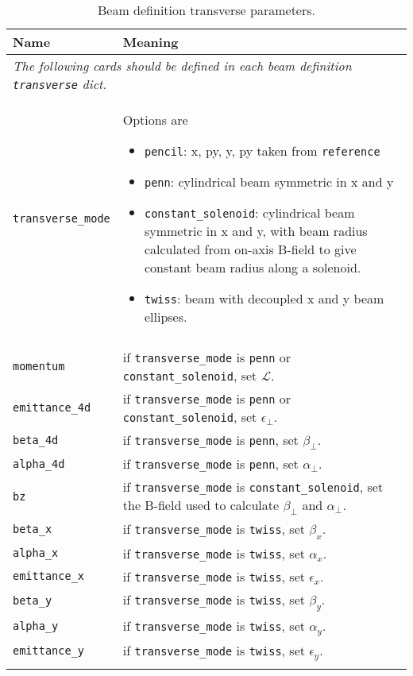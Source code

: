 \begin{table*}
\begin{center}
\caption{Beam definition transverse parameters.}
\begin{tabularx}{\linewidth}{lX}
Name & Meaning \\
\hline
\multicolumn{2}{|l|}{\emph{The following cards should be defined in each beam definition \verb|transverse| dict.}} \\
\hline
\verb|transverse_mode| & Options are
                          \begin{itemize}
                            \setlength{\itemsep}{0mm}
                            \item \verb|pencil|: x, py, y, py taken from \verb|reference|
                            \item \verb|penn|: cylindrical beam symmetric in x and y
                            \item \verb|constant_solenoid|: cylindrical beam symmetric in x and y, with beam radius calculated from on-axis B-field to give constant beam radius along a solenoid.
                            \item \verb|twiss|: beam with decoupled x and y beam ellipses.
                          \end{itemize} \\
\hline
\begin{tabular}{l}\verb|normalised_angular_| \\ \verb|momentum| \end{tabular} & if \verb|transverse_mode| is \verb|penn| or \verb|constant_solenoid|, set $\mathcal{L}$.\\
\verb|emittance_4d| & if \verb|transverse_mode| is \verb|penn| or \verb|constant_solenoid|, set $\epsilon_\perp$.\\
\verb|beta_4d| & if \verb|transverse_mode| is \verb|penn|, set $\beta_\perp$.\\
\verb|alpha_4d| & if \verb|transverse_mode| is \verb|penn|, set $\alpha_\perp$.\\
\verb|bz| & if \verb|transverse_mode| is \verb|constant_solenoid|, set the B-field used to calculate $\beta_\perp$ and $\alpha_\perp$.\\
\hline
\verb|beta_x| & if \verb|transverse_mode| is \verb|twiss|, set $\beta_x$.\\
\verb|alpha_x| & if \verb|transverse_mode| is \verb|twiss|, set $\alpha_x$.\\
\verb|emittance_x| & if \verb|transverse_mode| is \verb|twiss|, set $\epsilon_x$.\\
\verb|beta_y| & if \verb|transverse_mode| is \verb|twiss|, set $\beta_y$.\\
\verb|alpha_y| & if \verb|transverse_mode| is \verb|twiss|, set $\alpha_y$.\\
\verb|emittance_y| & if \verb|transverse_mode| is \verb|twiss|, set $\epsilon_y$.\\
\begin{makeimage} %
\end{makeimage} 
\end{tabularx}
\end{center}
\end{table*}


